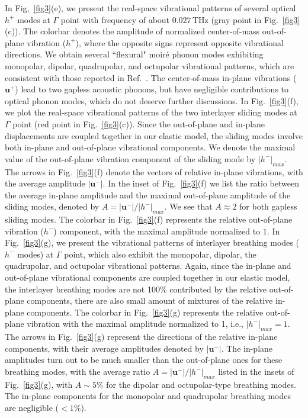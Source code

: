 \documentclass[aps,prx,10pt,twocolumn,superscriptaddress]{revtex4}
\begin{document}
In Fig,~\ref{fig3}(e), we present the real-space vibrational patterns of several optical $h^{+}$ modes at $\Gamma$ point with frequency of about $0.027\,$THz (gray point in Fig.~\ref{fig3}(c)). The colorbar denotes the amplitude of normalized center-of-mass out-of-plane vibration ($h^{+}$), where the opposite signs represent opposite vibrational directions. We obtain several ``flexural" moir\'e phonon modes exhibiting monopolar, dipolar, quadrupolar, and octupolar vibrational patterns, which are consistent with those reported in Ref.~. The center-of-mass in-plane vibrations ($\mathbf{u}^{+}$) lead to two gapless acoustic phonons, but have negligible contributions to optical phonon modes, which do not deserve further discussions. 
In Fig.~\ref{fig3}(f), we plot the real-space vibrational patterns of the two interlayer sliding modes at $\Gamma$ point (red point in Fig.~\ref{fig3}(c)). Since the out-of-plane and in-plane displacements are coupled together in our elastic model,  the sliding modes involve both in-plane and out-of-plane vibrational components.
We denote the maximal value of the out-of-plane vibration component of the sliding mode by $\vert h^{-}\vert_{max}$. The arrows in Fig.~\ref{fig3}(f) denote the vectors of relative in-plane vibrations, with the average amplitude $\vert \mathbf{u}^{-}\vert$. 
 In the inset of Fig.~\ref{fig3}(f) we list the ratio between the average in-plane   amplitude and the maximal out-of-plane amplitude of the sliding modes, 
denoted by $A\!=\!\vert \mathbf{u}^{-}\vert/\vert h^{-}\vert_{max}$. We see that $A\approx 2$ for both gapless sliding modes. The colorbar in Fig.~\ref{fig3}(f) represents the  relative out-of-plane vibration ($h^{-}$) component, with the maximal amplitude normalized to $1$. %
In Fig.~\ref{fig3}(g), we present the vibrational patterns of interlayer breathing modes ($h^{-}$ modes) at $\Gamma$ point, which also exhibit the monopolar, dipolar, the quadrupolar, and octupolar vibrational patterns.  Again, since the in-plane and out-of-plane vibrational components are coupled together in our elastic model, the interlayer breathing modes are not 100\% contributed by  the relative out-of-plane components, there are also small amount of mixtures of the relative in-plane components. 
The colorbar in Fig.~\ref{fig3}(g) represents the relative out-of-plane vibration with the maximal amplitude normalized to 1, i.e., $\vert h^{-}\vert_{max}=1$. The arrows in Fig.~\ref{fig3}(g) represent the directions of the relative in-plane components,  with their  average amplitudes  denoted by $\vert \mathbf{u}^{-}\vert$.  The in-plane amplitudes turn out to be much smaller than the out-of-plane ones for these breathing modes, with the average ratio $A=\vert \mathbf{u}^{-}\vert/\vert h^{-}\vert_{max}$ listed in the insets of Fig.~\ref{fig3}(g), with $A\sim 5\%$ for the dipolar and octupolar-type breathing modes. The in-plane components for the monopolar and quadrupolar breathing modes are negligible ($<\!1\%$). 
\end{document}
